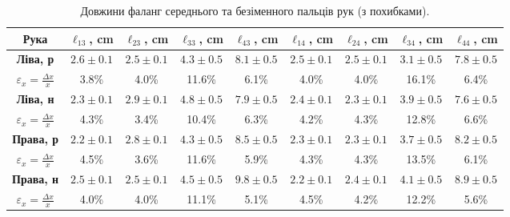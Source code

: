 \documentclass{hw_template}
\begin{document}
\begin{table}[H]
    \centering
    \hspace*{-3em}\begin{tabular}{c:cccccccc}
        \hline
        \textbf{Рука} & \textbf{$\ell_{13}$, cm} & \textbf{$\ell_{23}$, cm} & \textbf{$\ell_{33}$, cm} & \textbf{$\ell_{43}$, cm} & \textbf{$\ell_{14}$, cm} & \textbf{$\ell_{24}$, cm} & \textbf{$\ell_{34}$, cm} & \textbf{$\ell_{44}$, cm} \\
        \hline
        \textbf{Ліва, р} & $2.6 \pm 0.1$ & $2.5 \pm 0.1$ & $4.3 \pm 0.5$ & $8.1 \pm 0.5$ & $2.5 \pm 0.1$ & $2.5 \pm 0.1$ & $3.1 \pm 0.5$ & $7.8 \pm 0.5$  \\
        $\varepsilon_x = \frac{\Delta x}{x}$ & 3.8\% & 4.0\% & 11.6\% & 6.1\% & 4.0\% & 4.0\% & 16.1\% & 6.4\% \\
        \hdashline
        \textbf{Ліва, н} & $2.3 \pm 0.1$ & $2.9 \pm 0.1$ & $4.8 \pm 0.5$ & $7.9 \pm 0.5$ & $2.4 \pm 0.1$ & $2.3 \pm 0.1$ & $3.9 \pm 0.5$ & $7.6 \pm 0.5$  \\
        $\varepsilon_x = \frac{\Delta x}{x}$ & 4.3\% & 3.4\% & 10.4\% & 6.3\% & 4.2\% & 4.3\% & 12.8\% & 6.6\% \\
        \hdashline
        \textbf{Права, р} & $2.2 \pm 0.1$ & $2.8 \pm 0.1$ & $4.3 \pm 0.5$ & $8.5 \pm 0.5$ & $2.3 \pm 0.1$ & $2.3 \pm 0.1$ & $3.7 \pm 0.5$ & $8.2 \pm 0.5$  \\
        $\varepsilon_x = \frac{\Delta x}{x}$ & 4.5\% & 3.6\% & 11.6\% & 5.9\% & 4.3\% & 4.3\% & 13.5\% & 6.1\% \\
        \hdashline
        \textbf{Права, н} & $2.5 \pm 0.1$ & $2.5 \pm 0.1$ & $4.5 \pm 0.5$ & $9.8 \pm 0.5$ & $2.2 \pm 0.1$ & $2.4 \pm 0.1$ & $4.1 \pm 0.5$ & $8.9 \pm 0.5$ \\
        $\varepsilon_x = \frac{\Delta x}{x}$ & 4.0\% & 4.0\% & 11.1\% & 5.1\% & 4.5\% & 4.2\% & 12.2\% & 5.6\% \\
        \hline
    \end{tabular}
    \caption{Довжини фаланг середнього та безіменного пальців рук (з похибками).}
\end{table}
\end{document}
